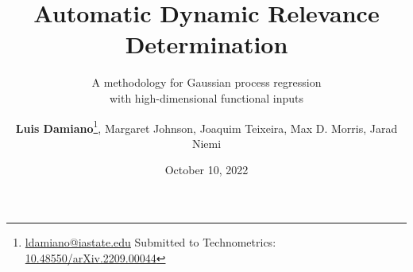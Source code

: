 \documentclass{snedecorbeamer}
\begin{document}
\title{Automatic Dynamic Relevance Determination}
\subtitle{A methodology for Gaussian process regression\\
  with high-dimensional functional inputs}
\date{October 10, 2022}


\renewcommand*{\thefootnote}{\fnsymbol{footnote}}
\author{
  \textbf{Luis Damiano}\footnote[2]{
    \tiny{\href{mailto:ldamiano@iastate.edu}{ldamiano@iastate.edu}}%
    \newline
    \tiny{Submitted to Technometrics:
      \href{https://doi.org/10.48550/arXiv.2209.00044}{10.48550/arXiv.2209.00044}}
  },
  Margaret Johnson,
  Joaquim Teixeira,
  Max D. Morris,
  Jarad Niemi}

\begin{frame}
  \titlepage{}
\end{frame}
\end{document}
